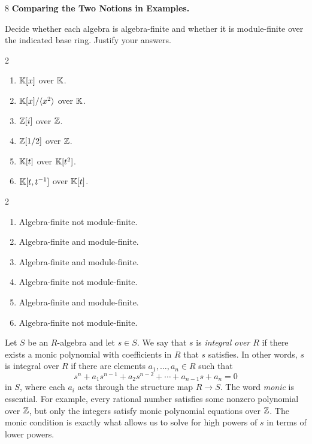 \documentclass[Notebook.tex]{subfiles}
\begin{document}
\begin{problem}{8}
    \textbf{Comparing the Two Notions in Examples.} 
    
    Decide whether each algebra is algebra-finite and whether it is module-finite over the indicated base ring. Justify your answers.
    \begin{multicols}{2}
    \begin{enumerate}
        \item $\mathbb K[x]$ over $\mathbb K$.
        \item $\mathbb K[x]/\langle x^2\rangle$ over $\mathbb K$.
        \item $\mathbb Z[i]$ over $\mathbb Z$.
        \item $\mathbb Z[1/2]$ over $\mathbb Z$.
        \item $\mathbb K[t]$ over $\mathbb K[t^2]$.
        \item $\mathbb K[t,t^{-1}]$ over $\mathbb K[t]$.
    \end{enumerate}
    \end{multicols}
\end{problem}

\begin{solution}
    \bbni
    \begin{multicols}{2}
        \begin{enumerate}
            \item Algebra-finite not module-finite. 
            \item Algebra-finite and module-finite. 
            \item Algebra-finite and module-finite. 
            \item Algebra-finite not module-finite. 
            \item Algebra-finite and module-finite. 
            \item Algebra-finite not module-finite. 
        \end{enumerate}
    \end{multicols}
\end{solution}

\vspace{.5in}
 
\hrulefill

Let $S$ be an $R$-algebra and let $s\in S$. We say that $s$ is \emph{integral over $R$} if there exists a monic polynomial with coefficients in $R$ that $s$ satisfies. In other words, $s$ is integral over $R$ if there are elements $a_1,\ldots,a_n\in R$ such that
\[
s^n+a_1s^{n-1}+a_2s^{n-2}+\cdots+a_{n-1}s+a_n=0
\]
in $S$, where each $a_i$ acts through the structure map $R\to S$. The word \emph{monic} is essential. For example, every rational number satisfies some nonzero polynomial over $\mathbb Z$, but only the integers satisfy monic polynomial equations over $\mathbb Z$. The monic condition is exactly what allows us to solve for high powers of $s$ in terms of lower powers.
\end{document}
